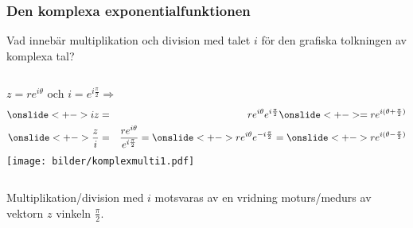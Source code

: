 \documentclass[slidestop,blue,handout,9pt]{beamer}
\begin{document}
\begin{frame}
\frametitle{Den komplexa exponentialfunktionen}
\begin{exempel}
Vad innebär multiplikation och division med talet $i$ för den
grafiska tolkningen av komplexa tal?
\onslide<+->
\begin{losning}
\vspace{-0.8cm}
\begin{columns}[c]
\column{6cm}    
$z=re^{i\theta }$ och $i=e^{i\frac{\pi }{2}} \Rightarrow$  
\begin{eqnarray*}
\onslide<+->
iz& =&re^{i\theta }e^{i\frac{\pi }{2}}\onslide<+-> =re^{i(\theta +\frac{\pi }{2})} \\
\onslide<+->
\frac{z}{i}& =&\frac{re^{i\theta }}{e^{i\frac{\pi }{2}}}=\onslide<+->
re^{i\theta }e^{-i\frac{\pi }{2}}=\onslide<+->
re^{i(\theta -\frac{\pi }{2})}
\end{eqnarray*}
\onslide<+->
\column{3.7cm}
\hspace{-1cm}
\texttt{[image: bilder/komplexmulti1.pdf]}
\end{columns}
\onslide<+->
\vspace{0.3cm}
{\color{hhgreen}Multiplikation}/{\color{hhred}division} med $i$ motsvaras av en vridning {\color{hhgreen} moturs}/{\color{hhred}medurs} av
vektorn $z$ vinkeln $\frac{\pi}{2}$.

\end{losning}
\end{exempel}

\end{frame}


\end{document}
